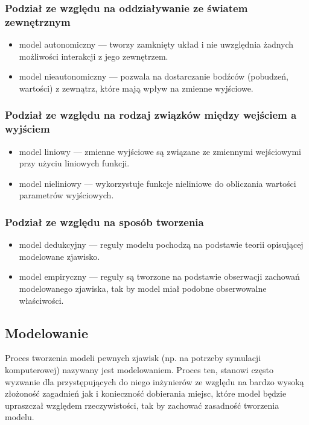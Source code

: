 \subsubsection{Podział ze względu na oddziaływanie ze światem zewnętrznym}
\par{
\begin{itemize}
\item model autonomiczny --- tworzy zamknięty układ i nie uwzględnia żadnych możliwości interakcji z jego zewnętrzem.
\item model nieautonomiczny --- pozwala na dostarczanie bodźców (pobudzeń, wartości) z zewnątrz, które mają wpływ na zmienne wyjściowe.
\end{itemize}
}

\subsubsection{Podział ze względu na rodzaj związków między wejściem a wyjściem}
\par{
\begin{itemize}
\item model liniowy --- zmienne wyjściowe są związane ze zmiennymi wejściowymi przy użyciu liniowych funkcji.
\item model nieliniowy --- wykorzystuje funkcje nieliniowe do obliczania wartości parametrów wyjściowych.
\end{itemize}
}

\subsubsection{Podział ze względu na sposób tworzenia}
\par{
\begin{itemize}
\item model dedukcyjny --- reguły modelu pochodzą na podstawie teorii opisującej modelowane zjawisko.
\item model empiryczny --- reguły są tworzone na podstawie obserwacji zachowań modelowanego zjawiska, tak by model miał podobne obserwowalne właściwości.
\end{itemize}
}

\subsection{Modelowanie}
\par{
Proces tworzenia modeli pewnych zjawisk (np. na potrzeby symulacji komputerowej) nazywany jest modelowaniem. Proces ten, stanowi często wyzwanie dla przystępujących do niego inżynierów ze względu na bardzo wysoką złożoność zagadnień jak i konieczność dobierania miejsc, które model będzie upraszczał względem rzeczywistości, tak by zachować zasadność tworzenia modelu.
}

